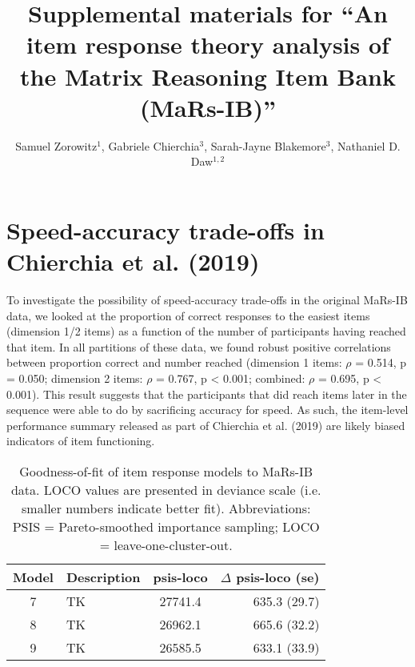 \documentclass[a4paper,man,natbib]{apa6}
\title{Supplemental materials for ``An item response theory analysis of the Matrix Reasoning Item Bank (MaRs-IB)''}
\author{Samuel Zorowitz$^1$, Gabriele Chierchia$^3$, Sarah-Jayne Blakemore$^3$, Nathaniel D. Daw$^{1,2}$}
\affiliation{$^1$Princeton Neuroscience Institute, Princeton University, USA\\$^2$Department of Psychology, Princeton University, USA\\$^3$Department of Psychology, University of Cambridge, Downing Street, Cambridge, UK}
\begin{document}
\maketitle

\section*{Speed-accuracy trade-offs in Chierchia et al. (2019)}

To investigate the possibility of speed-accuracy trade-offs in the original MaRs-IB data, we looked at the proportion of correct responses to the easiest items (dimension 1/2 items) as a function of the number of participants having reached that item. In all partitions of these data, we found robust positive correlations between proportion correct and number reached (dimension 1 items: $\rho$ = 0.514, p = 0.050; dimension 2 items: $\rho$ = 0.767, p < 0.001; combined: $\rho$ = 0.695, p < 0.001). This result suggests that the participants that did reach items later in the sequence were able to do by sacrificing accuracy for speed. As such, the item-level performance summary released as part of Chierchia et al. (2019) are likely biased indicators of item functioning.

\begin{table}
    \centering
    \begin{tabular*}{\textwidth}{clcr}
    \toprule
    Model & Description & psis-loco & $\Delta$ psis-loco (se) \\
    \midrule
    7 & TK  & 27741.4 & 635.3 (29.7) \\
    8 & TK  & 26962.1 & 665.6 (32.2) \\
    9 & TK & 26585.5 & 633.1 (33.9) \\
    \bottomrule
    \end{tabular*}
    \caption{\label{tab:2}\normalfont Goodness-of-fit of item response models to MaRs-IB data. LOCO values are presented in deviance scale (i.e. smaller numbers indicate better fit). Abbreviations: PSIS = Pareto-smoothed importance sampling; LOCO = leave-one-cluster-out.}
    \label{table:2}
\end{table}
\end{document}
